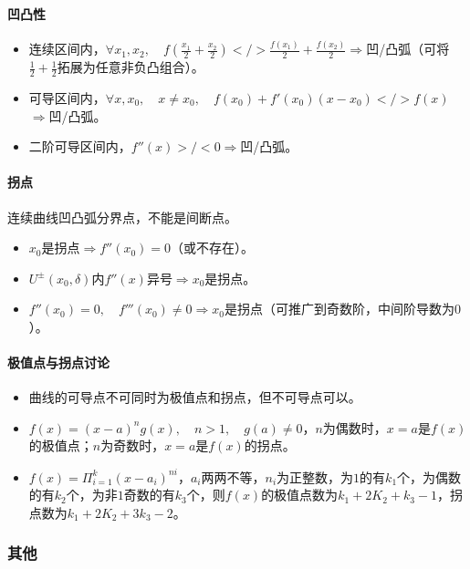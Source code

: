 \documentclass[
12pt, %
a4paper, 
oneside, %
]{scrartcl}
\begin{document}
\paragraph{凹凸性}
\begin{itemize}
\item 连续区间内，$ \forall x_1, x_2, \quad f(\frac{x_1}{2} + \frac{x_2}{2}) </> \frac{f(x_1)}{2} + \frac{f(x_2)}{2} $$ \Rightarrow $凹/凸弧（可将$ \frac{1}{2} + \frac{1}{2} $拓展为任意非负凸组合）。
\item 可导区间内，$ \forall x, x_0, \quad x \neq x_0, \quad f(x_0) + f'(x_0) (x - x_0) </> f(x) $$ \Rightarrow $凹/凸弧。
\item 二阶可导区间内，$ f''(x) >/< 0 $$ \Rightarrow $凹/凸弧。
\end{itemize}
\paragraph{拐点}
连续曲线凹凸弧分界点，不能是间断点。
\begin{itemize}
\item $ x_0 $是拐点$ \Rightarrow $$ f''(x_0) = 0 $（或不存在）。
\item $ U^{\pm}(x_0, \delta) $内$ f''(x) $异号$ \Rightarrow $$ x_0 $是拐点。
\item $ f''(x_0) = 0, \quad f'''(x_0) \neq 0 $$ \Rightarrow $$ x_0 $是拐点（可推广到奇数阶，中间阶导数为$ 0 $）。
\end{itemize}
\paragraph{极值点与拐点讨论}
\begin{itemize}
\item 曲线的可导点不可同时为极值点和拐点，但不可导点可以。
\item $ f(x) = (x - a)^n g(x), \quad n > 1, \quad g(a) \neq 0 $，$ n $为偶数时，$ x = a $是$ f(x) $的极值点；$ n $为奇数时，$ x = a $是$ f(x) $的拐点。
\item $ f(x) = \Pi_{i = 1}^k (x - a_i)^{ni} $，$ a_i $两两不等，$ n_i $为正整数，为$ 1 $的有$ k_1 $个，为偶数的有$ k_2 $个，为非$ 1 $奇数的有$ k_3 $个，则$ f(x) $的极值点数为$ k_1 + 2K_2 + k_3 - 1 $，拐点数为$ k_1 + 2K_2 + 3k_3 - 2 $。
\end{itemize}
\subsubsection[其他]{其他}
\end{document}
